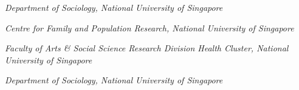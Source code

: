 \begin{aka}
    \item [2019] 
    \begin{akb}
        \item \textit{Department of Sociology, National University of Singapore}
    \end{akb}

    \item [2019] 
    \begin{akb}
        \item \textit{Centre for Family and Population Research, National University of Singapore}
    \end{akb}

    \item [2019] 
    \begin{akb}
        \item \textit{Faculty of Arts \& Social Science Research Division Health Cluster, National University of Singapore}
    \end{akb}

    \item [2018]
    \begin{akb}
        \item \textit{Department of Sociology, National University of Singapore}
    \end{akb}



\end{aka}
